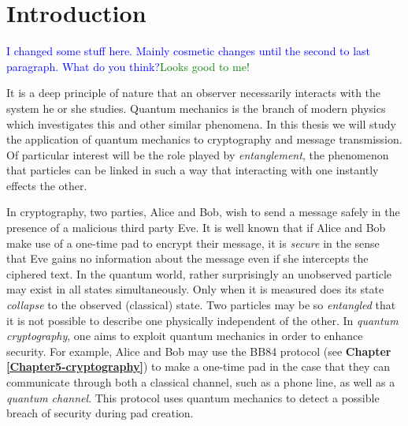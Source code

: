 
\chapter{Introduction} %

\label{Chapter1-introduction} %


\newcommand{\keyword}[1]{\textbf{#1}}
\newcommand{\tabhead}[1]{\textbf{#1}}
\newcommand{\code}[1]{\texttt{#1}}
\newcommand{\file}[1]{\texttt{\bfseries#1}}
\newcommand{\option}[1]{\texttt{\itshape#1}}


\textcolor{blue}{I changed some stuff here.  Mainly cosmetic changes until the second to last paragraph.  What do you think?}\textcolor{green}{Looks good to me!}

It is a deep principle of nature that an observer necessarily interacts with the system he or she studies. Quantum mechanics is the branch of modern physics which investigates this and other similar phenomena. In this thesis we will study the application of quantum mechanics to cryptography and message transmission. Of particular interest will be the role played by {\emph{entanglement}}, the phenomenon that particles can be linked in such a way that interacting with one instantly effects the other. 

In cryptography, two parties, Alice and Bob, wish to send a message safely in the presence of a malicious third party Eve. It is well known that if Alice and Bob make use of a one-time pad to encrypt their message, it is \emph{secure} in the sense that Eve gains no information about the message even if she intercepts the ciphered text. 
In the quantum world, rather surprisingly an unobserved particle may exist in all states simultaneously. Only when it is measured does its state {\emph{collapse}} to the observed (classical) state.  Two particles may be so {\emph{entangled}} that it is not possible to describe one physically independent of the other.  In {\emph{quantum cryptography}}, one aims to exploit quantum mechanics in order to enhance security. For example, Alice and Bob may use the BB84 protocol (see \textbf{Chapter \ref{Chapter5-cryptography}}) to make a one-time pad in the case that they can communicate through both a classical channel, such as a phone line, as well as a \textit{quantum channel}. This protocol uses quantum mechanics to detect a possible breach of security during pad creation.  



